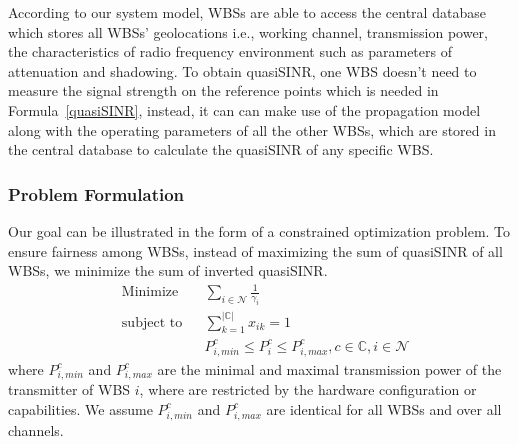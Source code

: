 \documentclass[times]{ettauth}
\newcommand{\ie}{i.e., }
\theoremstyle{mytheoremstyle}
\theoremstyle{mytheoremstyle}
\theoremstyle{mytheoremstyle}
\begin{document}
According to our system model, WBSs are able to access the central database which stores all WBSs' geolocations \ie working channel, transmission power, the characteristics of radio frequency environment such as parameters of attenuation and shadowing.
To obtain quasiSINR, one WBS doesn't need to measure the signal strength on the reference points which is needed in Formula~\ref{quasiSINR}, instead, it can can make use of the propagation model~\cite{Jaentti11} along with the operating parameters of all the other WBSs, which are stored in the central database to calculate the quasiSINR of any specific WBS.



\subsubsection*{Problem Formulation}
Our goal can be illustrated in the form of a constrained optimization problem.
To ensure fairness among WBSs, instead of maximizing the sum of quasiSINR of all WBSs, we minimize the sum of inverted quasiSINR. 
	\begin{equation}
\label{problem}
			\begin{aligned}
			& {\text{Minimize}}
			& & \sum_{i\in \mathcal{N}}\frac{1}{\gamma_{i}} \\
			& \text{subject to}
			& & \sum_{k=1}^{|\mathbb{C}|}x_{ik}=1 \\
			& & & P_{i,min}^c \leq P_i^c \leq P_{i,max}^c, c \in \mathbb{C}, i\in \mathcal{N}
			\end{aligned}
		\end{equation}
		where $P_{i,min}^c$ and $P_{i,max}^c$ are the minimal and maximal transmission power of the transmitter of WBS $i$, where are restricted by the hardware configuration or capabilities.
We assume $P_{i,min}^c$ and $P_{i,max}^c$ are identical for all WBSs and over all channels.
\end{document}
